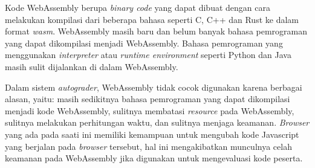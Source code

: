 \par Kode WebAssembly berupa \textit{binary code} yang dapat dibuat dengan cara melakukan kompilasi dari beberapa bahasa seperti C, C++ dan Rust ke dalam format \textit{wasm}. WebAssembly masih baru dan belum banyak bahasa pemrograman yang dapat dikompilasi menjadi WebAssembly. Bahasa pemrograman yang menggunakan \textit{interpreter} atau \textit{runtime environment} seperti Python dan Java masih sulit dijalankan di dalam WebAssembly.

\par Dalam sistem \textit{autograder}, WebAssembly tidak cocok digunakan karena berbagai alasan, yaitu: masih sedikitnya bahasa pemrograman yang dapat dikompilasi menjadi kode WebAssembly, sulitnya membatasi \textit{resource} pada WebAssembly, sulitnya melakukan perhitungan waktu, dan sulitnya menjaga keamanan. \textit{Browser} yang ada pada saati ini memiliki kemampuan untuk mengubah kode Javascript yang berjalan pada \textit{browser} tersebut, hal ini mengakibatkan munculnya celah keamanan pada WebAssembly jika digunakan untuk mengevaluasi kode peserta.
